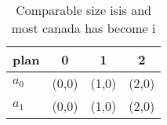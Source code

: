\documentclass[a4paper]{article}
\begin{document}
\begin{table}
\begin{adjustbox}{width=0.6\columnwidth}
\begin{tabular}{|l|l|l|l|}
\hline
\textbf{plan} & \multicolumn{1}{c|}{\textbf{0}} & \multicolumn{1}{c|}{\textbf{1}} & \multicolumn{1}{c|}{\textbf{2}} \\ \hline
\textbf{$a_0$}  & (0,0) & (1,0) & (2,0) \\ \hline
\textbf{$a_1$}  & (0,0) & (1,0) & (2,0) \\ \hline
\end{tabular}
\end{adjustbox}
\caption{Comparable size isis and most canada has become i
}
\end{table}
\end{document}
